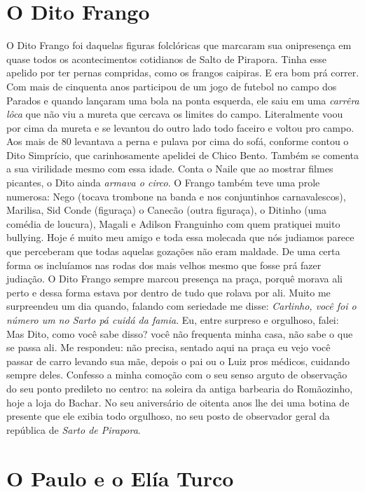\documentclass[12pt,brazil,]{book}
\begin{document}
\section{O Dito Frango}\label{o-dito-frango}

O Dito Frango foi daquelas figuras folclóricas que marcaram sua
onipresença em quase todos os acontecimentos cotidianos de Salto de
Pirapora. Tinha esse apelido por ter pernas compridas, como os frangos
caipiras. E era bom prá correr. Com mais de cinquenta anos participou de
um jogo de futebol no campo dos Parados e quando lançaram uma bola na
ponta esquerda, ele saiu em uma \emph{carrêra lôca} que não viu a mureta
que cercava os limites do campo. Literalmente voou por cima da mureta e
se levantou do outro lado todo faceiro e voltou pro campo. Aos mais de
80 levantava a perna e pulava por cima do sofá, conforme contou o Dito
Simprício, que carinhosamente apelidei de Chico Bento. Também se comenta
a sua virilidade mesmo com essa idade. Conta o Naile que ao mostrar
filmes picantes, o Dito ainda \emph{armava o circo}. O Frango também
teve uma prole numerosa: Nego (tocava trombone na banda e nos
conjuntinhos carnavalescos), Marilisa, Sid Conde (figuraça) o Canecão
(outra figuraça), o Ditinho (uma comédia de loucura), Magali e Adilson
Franguinho com quem pratiquei muito bullying. Hoje é muito meu amigo e
toda essa molecada que nós judiamos parece que perceberam que todas
aquelas gozações não eram maldade. De uma certa forma os incluíamos nas
rodas dos mais velhos mesmo que fosse prá fazer judiação. O Dito Frango
sempre marcou presença na praça, porquê morava ali perto e dessa forma
estava por dentro de tudo que rolava por ali. Muito me surpreendeu um
dia quando, falando com seriedade me disse: \emph{Carlinho, você foi o
número um no Sarto pá cuidá da famia}. Eu, entre surpreso e orgulhoso,
falei: Mas Dito, como você sabe disso? você não frequenta minha casa,
não sabe o que se passa ali. Me respondeu: não precisa, sentado aqui na
praça eu vejo você passar de carro levando sua mãe, depois o pai ou o
Luiz pros médicos, cuidando sempre deles. Confesso a minha comoção com o
seu senso arguto de observação do seu ponto predileto no centro: na
soleira da antiga barbearia do Romãozinho, hoje a loja do Bachar. No seu
aniversário de oitenta anos lhe dei uma botina de presente que ele
exibia todo orgulhoso, no seu posto de observador geral da república de
\emph{Sarto de Pirapora}.

\section{O Paulo e o Elía Turco}\label{o-paulo-e-o-eluxeda-turco}
\end{document}
